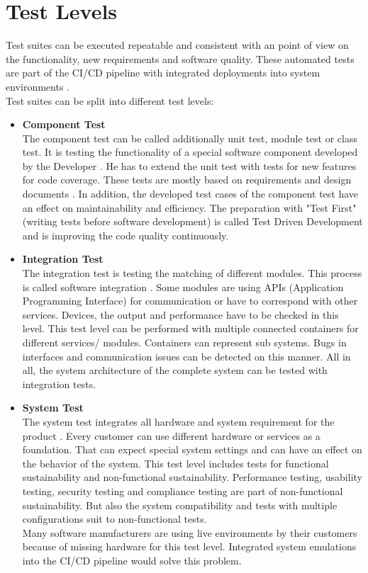 \section{Test Levels}\label{TestLevel}

Test suites can be executed repeatable and consistent with an point of view on the functionality, new requirements and software quality. These automated tests are part of the \gls{CI/CD} pipeline with integrated deployments into system environments \cite[~p.112]{Scholl2019}. \\
Test suites can be split into different test levels:
\begin{itemize}
\item \textbf{Component Test}  \\
The component test can be called additionally unit test, module test or class test. 
It is testing the functionality of a special software component developed by the Developer \cite[~p.66]{Spillner2019}.
He has to extend the unit test with tests for new features for code coverage. These tests are mostly based on requirements and design documents \cite[~p.63]{Spillner2019}. In addition, the developed test cases of the component test have an effect on maintainability and efficiency.
The preparation with "Test First" (writing tests before software development) is called Test Driven Development and is improving the code quality continuously.

\item \textbf{Integration Test} \\
The integration test is testing the matching of different modules. This process is called software integration \cite[~p.71]{Spillner2019}. Some modules are using APIs (Application Programming Interface) for communication or have to correspond with other services.
Devices, the output and performance have to be checked in this level.
This test level can be performed with multiple connected containers for different services/ modules. Containers can represent sub systems. Bugs in interfaces and communication issues can be detected on this manner.
All in all, the system architecture of the complete system can be tested with integration tests.

\item \textbf{System Test} \\
The system test integrates all hardware and system requirement for the product \cite[~p.79]{Spillner2019}.
Every customer can use different hardware or services as a foundation. That can expect special system settings and can have an effect on the behavior of the system.
This test level includes tests for functional sustainability \cite[~p.87]{Spillner2019} and non-functional sustainability.
Performance testing, usability testing, security testing and compliance testing are part of non-functional sustainability. But also the system compatibility and tests with multiple configurations suit to non-functional tests. \\
Many software manufacturers are using live environments by their customers because of missing hardware for this test level. Integrated system emulations into the \gls{CI/CD} pipeline would solve this problem.


\end{itemize}
